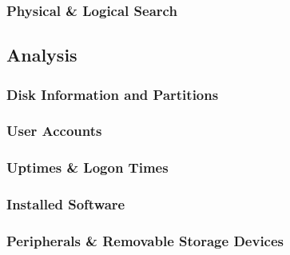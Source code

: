 \documentclass[a4paper,12pt]{article}
\begin{document}
\subsubsection{Physical \& Logical Search}
\lipsum[66]
\subsection{Analysis}
\lipsum[66]
\subsubsection{Disk Information and Partitions}
\label{sec:disk_information_partitions}
\lipsum[66]
\subsubsection{User Accounts}
\label{sec:user_accounts}
\lipsum[66]
\subsubsection{Uptimes \& Logon Times}
\label{sec:logon_times}
\lipsum[66]
\subsubsection{Installed Software}
\label{sec:installed_software}
\lipsum[66]
\subsubsection{Peripherals \& Removable Storage Devices}
\label{sec:peripherals_removable_storage}
\lipsum[66]
\end{document}
